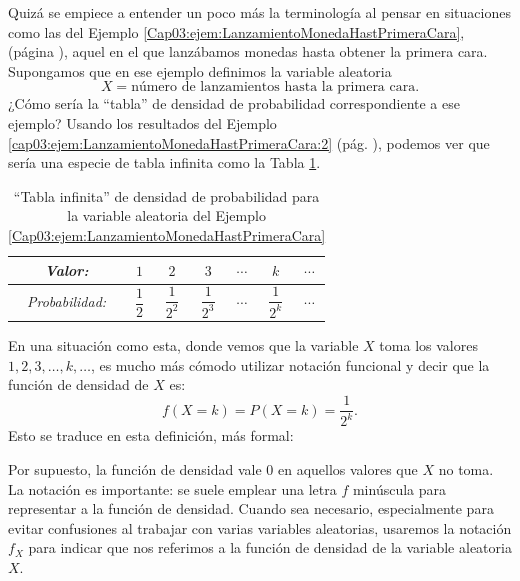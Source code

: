 Quizá se empiece a entender un poco más la terminología al pensar en situaciones como las del Ejemplo \ref{Cap03:ejem:LanzamientoMonedaHastPrimeraCara}, (página \pageref{Cap03:ejem:LanzamientoMonedaHastPrimeraCara}), aquel  en el que lanzábamos monedas hasta obtener la primera cara. Supongamos que en ese ejemplo definimos la variable aleatoria
\[X=\mbox{número de lanzamientos hasta la primera cara.}\]
¿Cómo sería la ``tabla'' de densidad de probabilidad correspondiente a ese ejemplo? Usando los resultados del Ejemplo \ref{cap03:ejem:LanzamientoMonedaHastPrimeraCara:2} (pág. \pageref{cap03:ejem:LanzamientoMonedaHastPrimeraCara:2}), podemos ver que sería una especie de tabla infinita como la Tabla \ref{cap04:tabla:tablaDensidadProbabilidadInfinita}.
    \begin{table}[h!]
    \begin{center}
    \begin{tabular}[t]{|c|c|c|c|c|c|c}
    \hline
    \rule{0cm}{0.5cm}{\em Valor:}&$1$&$2$&$3$&$\cdots$&$k$&$\cdots$\\
    \hline
    \rule{0cm}{0.7cm}{\em Probabilidad:}&$\dfrac{1}{2}$&$\dfrac{1}{2^2}$&$\dfrac{1}{2^3}$&$\cdots$&$\dfrac{1}{2^k}$&$\cdots$\\[4mm]
    \hline
    \end{tabular}
    \end{center}
    \caption{``Tabla infinita'' de densidad de probabilidad para la variable aleatoria del Ejemplo \ref{Cap03:ejem:LanzamientoMonedaHastPrimeraCara}}\label{cap04:tabla:tablaDensidadProbabilidadInfinita}
    \end{table}
En una situación como esta, donde vemos que la variable $X$ toma los valores $1,2,3,\ldots,k,\ldots$, es mucho más cómodo utilizar notación funcional y decir que la función de densidad de $X$ es:
\[f(X=k)=P(X=k)=\dfrac{1}{2^k}.\]
Esto se traduce en esta definición, más formal:
    \begin{center}
    \end{center}
Por supuesto, la función de densidad vale 0 en aquellos valores que $X$ no toma. La notación es importante: se suele emplear una letra $f$ minúscula para representar a la función de densidad. Cuando sea necesario, especialmente para evitar confusiones al trabajar con varias variables aleatorias, usaremos la notación $f_X$ para indicar que nos referimos a la función de densidad de la variable aleatoria $X$.

